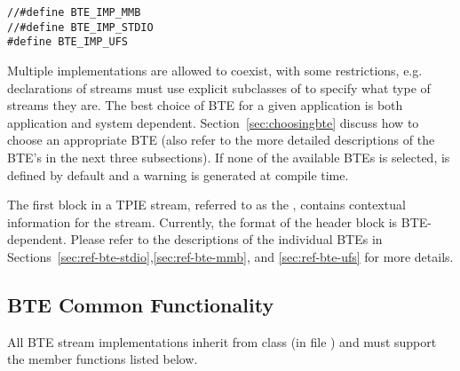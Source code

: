 \begin{verbatim}
//#define BTE_IMP_MMB
//#define BTE_IMP_STDIO
#define BTE_IMP_UFS
\end{verbatim}

Multiple implementations are allowed to coexist, with some
restrictions, e.g. declarations of streams must use explicit subclasses
of  to specify what type of streams they
are. 
 The best choice of BTE for a
given application is both application and system dependent.
Section~\ref{sec:choosingbte} discuss how to choose an
appropriate BTE (also refer to the more detailed
descriptions of the BTE's in the next three subsections). If
none of the available BTEs is selected,
 is defined by default and a warning
is generated at compile time.


The first block in a TPIE stream, referred to as the
, contains
contextual information for the stream. Currently, the format
of the header block is BTE-dependent. Please refer to the
descriptions of the individual BTEs in
Sections~\ref{sec:ref-bte-stdio},\ref{sec:ref-bte-mmb}, and
\ref{sec:ref-bte-ufs} for more details.

\subsection{BTE Common Functionality}

All BTE stream implementations inherit from class
 (in file
) and must support the member
functions listed below. 



